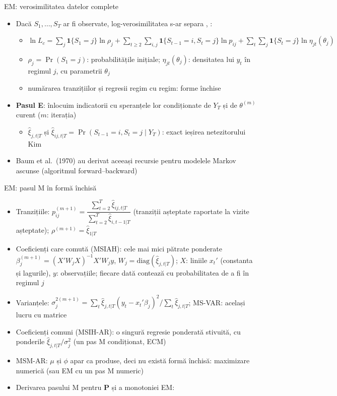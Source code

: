 \begin{frame}{EM: verosimilitatea datelor complete}
\itemsize{\small}
\begin{itemize}
    \item Dacă $S_1, \dots, S_T$ ar fi observate, log-verosimilitatea s-ar separa , :
    \begin{itemize}
        \item $\ln L_c = \sum_j \mathbf{1}\{S_1 = j\}\ln\rho_j + \sum_{t\ge2}\sum_{i,j}\mathbf{1}\{S_{t-1} = i, S_t = j\}\ln p_{ij} + \sum_t\sum_j \mathbf{1}\{S_t = j\}\ln\eta_{jt}(\theta_j)$
        \item $\rho_j = \Pr(S_1 = j)$: probabilitățile inițiale; $\eta_{jt}(\theta_j)$: densitatea lui $y_t$ în regimul $j$, cu parametrii $\theta_j$
        \item numărarea tranzițiilor și regresii regim cu regim: forme închise
    \end{itemize}
    \item \textbf{Pasul E}: înlocuim indicatorii cu speranțele lor condiționate de $Y_T$ și de $\theta^{(m)}$ curent ($m$: iterația)
    \begin{itemize}
        \item $\hat\xi_{j,t|T}$ și $\hat\xi_{ij,t|T} = \Pr(S_{t-1} = i, S_t = j \mid Y_T)$: exact ieșirea netezitorului Kim
    \end{itemize}
    \item Baum et al.\ (1970) au derivat aceeași recursie pentru modelele Markov ascunse (algoritmul forward--backward)
\end{itemize}
\end{frame}

\begin{frame}{EM: pasul M în formă închisă}
\itemsize{\small}
\begin{itemize}
    \item Tranzițiile: $p_{ij}^{(m+1)} = \dfrac{\sum_{t=2}^T \hat\xi_{ij,t|T}}{\sum_{t=2}^T \hat\xi_{i,t-1|T}}$ (tranziții așteptate raportate la vizite așteptate); $\rho^{(m+1)} = \hat\xi_{1|T}$
    \item Coeficienți care comută (MSIAH): cele mai mici pătrate ponderate $\beta_j^{(m+1)} = (X'W_jX)^{-1}X'W_jy$, $W_j = \mathrm{diag}(\hat\xi_{j,t|T})$; $X$: liniile $x_t'$ (constanta și lagurile), $y$: observațiile; fiecare dată contează cu probabilitatea de a fi în regimul $j$
    \item Varianțele: $\sigma_j^{2(m+1)} = \sum_t\hat\xi_{j,t|T}(y_t - x_t'\beta_j)^2/\sum_t\hat\xi_{j,t|T}$; MS-VAR: același lucru cu matrice
    \item Coeficienți comuni (MSIH-AR): o singură regresie ponderată stivuită, cu ponderile $\hat\xi_{j,t|T}/\sigma_j^2$ (un pas M condiționat, ECM)
    \item MSM-AR: $\mu$ și $\phi$ apar ca produse, deci nu există formă închisă: maximizare numerică (sau EM cu un pas M numeric)
    \item Derivarea pasului M pentru $\mathbf{P}$ și a monotoniei EM:   %
\end{itemize}
\end{frame}

